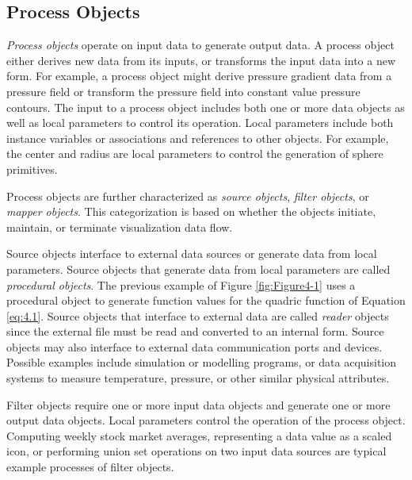 \subsection{Process Objects}
\label{subsec:process_objects}

\emph{Process objects} operate on input data to generate output data. A process object either derives new data from its inputs, or transforms the input data into a new form. For example, a process object might derive pressure gradient data from a pressure field or transform the pressure field into constant value pressure contours. The input to a process object includes both one or more data objects as well as local parameters to control its operation. Local parameters include both instance variables or associations and references to other objects. For example, the center and radius are local parameters to control the generation of sphere primitives.

Process objects are further characterized as \emph{source objects}, \emph{filter objects}, or \emph{mapper objects}. This categorization is based on whether the objects initiate, maintain, or terminate visualization data flow.

Source objects interface to external data sources or generate data from local parameters. Source objects that generate data from local parameters are called \emph{procedural objects}. The previous example of Figure \ref{fig:Figure4-1} uses a procedural object to generate function values for the quadric function of Equation \ref{eq:4.1}. Source objects that interface to external data are called \emph{reader} objects since the external file must be read and converted to an internal form. Source objects may also interface to external data communication ports and devices. Possible examples include simulation or modelling programs, or data acquisition systems to measure temperature, pressure, or other similar physical attributes.

Filter objects require one or more input data objects and generate one or more output data objects. Local parameters control the operation of the process object. Computing weekly stock market averages, representing a data value as a scaled icon, or performing union set operations on two input data sources are typical example processes of filter objects.

